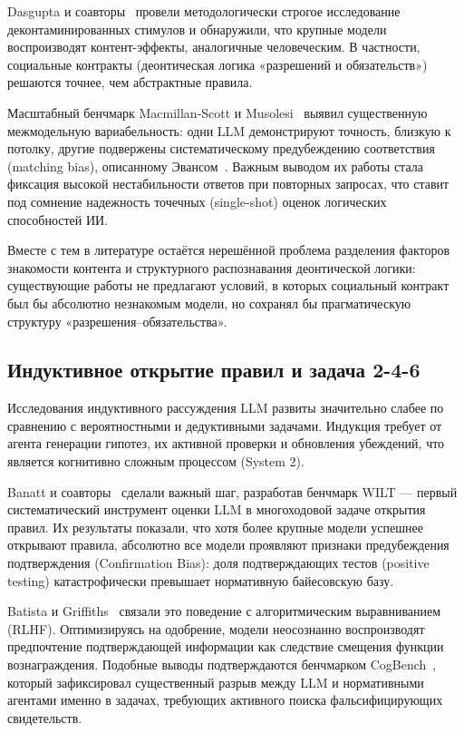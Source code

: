 Dasgupta и соавторы~\cite{dasgupta2024language} провели методологически строгое исследование деконтаминированных стимулов и обнаружили, что крупные модели воспроизводят контент-эффекты, аналогичные человеческим. В частности, социальные контракты (деонтическая логика «разрешений и обязательств») решаются точнее, чем абстрактные правила.

Масштабный бенчмарк Macmillan-Scott и Musolesi~\cite{macmillan2024irrationality} выявил существенную межмодельную вариабельность: одни LLM демонстрируют точность, близкую к потолку, другие подвержены систематическому предубеждению соответствия (matching bias), описанному Эвансом~\cite{evans1998matching}. Важным выводом их работы стала фиксация высокой нестабильности ответов при повторных запросах, что ставит под сомнение надежность точечных (single-shot) оценок логических способностей ИИ.

Вместе с тем в литературе остаётся нерешённой проблема разделения факторов знакомости контента и структурного распознавания деонтической логики: существующие работы не предлагают условий, в которых социальный контракт был бы абсолютно незнакомым модели, но сохранял бы прагматическую структуру «разрешения--обязательства».

\subsection{Индуктивное открытие правил и задача 2-4-6}

Исследования индуктивного рассуждения LLM развиты значительно слабее по сравнению с вероятностными и дедуктивными задачами. Индукция требует от агента генерации гипотез, их активной проверки и обновления убеждений, что является когнитивно сложным процессом (System 2).

Banatt и соавторы~\cite{banatt2024wilt} сделали важный шаг, разработав бенчмарк WILT --- первый систематический инструмент оценки LLM в многоходовой задаче открытия правил. Их результаты показали, что хотя более крупные модели успешнее открывают правила, абсолютно все модели проявляют признаки предубеждения подтверждения (Confirmation Bias): доля подтверждающих тестов (positive testing) катастрофически превышает нормативную байесовскую базу.

Batista и Griffiths~\cite{batista2026rational} связали это поведение с алгоритмическим выравниванием (RLHF). Оптимизируясь на одобрение, модели неосознанно воспроизводят предпочтение подтверждающей информации как следствие смещения функции вознаграждения. Подобные выводы подтверждаются бенчмарком CogBench~\cite{coda2024cogbench}, который зафиксировал существенный разрыв между LLM и нормативными агентами именно в задачах, требующих активного поиска фальсифицирующих свидетельств.

